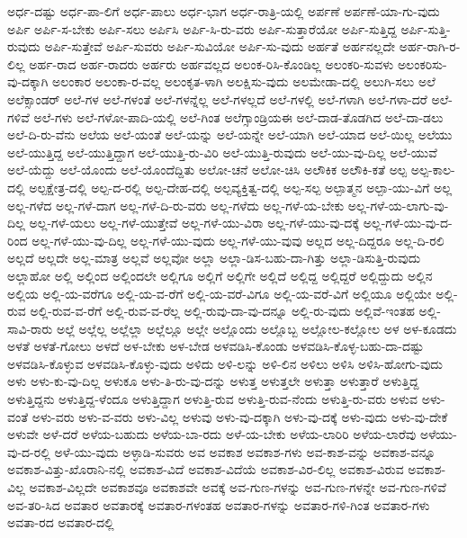 {ಅರ್ಧ-ದಷ್ಟು
ಅರ್ಧ-ಪಾ-ಲಿಗೆ
ಅರ್ಧ-ಪಾಲು
ಅರ್ಧ-ಭಾಗ
ಅರ್ಧ-ರಾತ್ರಿ-ಯಲ್ಲಿ
ಅರ್ಪಣೆ
ಅರ್ಪಣೆ-ಯಾ-ಗು-ವುದು
ಅರ್ಪಿ
ಅರ್ಪಿ-ಸ-ಬೇಕು
ಅರ್ಪಿ-ಸಲು
ಅರ್ಪಿಸಿ
ಅರ್ಪಿ-ಸಿ-ರು-ವರು
ಅರ್ಪಿ-ಸುತ್ತಾರೆಯೋ
ಅರ್ಪಿ-ಸುತ್ತಿದ್ದ
ಅರ್ಪಿ-ಸುತ್ತಿ-ರುವುದು
ಅರ್ಪಿ-ಸುತ್ತೇವೆ
ಅರ್ಪಿ-ಸುವರು
ಅರ್ಪಿ-ಸುವಿಯೋ
ಅರ್ಪಿ-ಸು-ವುದು
ಅರ್ಹತೆ
ಅರ್ಹನಲ್ಲದೇ
ಅರ್ಹ-ರಾಗಿ-ರ-ಲಿಲ್ಲ
ಅರ್ಹ-ರಾದ
ಅರ್ಹ-ರಾದರು
ಅರ್ಹರು
ಅರ್ಹವಲ್ಲದ
ಅಲಂಕ-ರಿಸಿ-ಕೊಂಡಿಲ್ಲ
ಅಲಂಕರಿ-ಸುವಳು
ಅಲಂಕರಿಸು-ವು-ದಕ್ಕಾಗಿ
ಅಲಂಕಾರ
ಅಲಂಕಾ-ರ-ವಲ್ಲ
ಅಲಂಕೃತ-ಳಾಗಿ
ಅಲಕ್ಷಿಸು-ವುದು
ಅಲಮೇಡಾ-ದಲ್ಲಿ
ಅಲುಗಿ-ಸಲು
ಅಲೆ
ಅಲೆಕ್ಸಾಂಡರ್
ಅಲೆ-ಗಳ
ಅಲೆ-ಗಳಂತೆ
ಅಲೆ-ಗಳನ್ನೆಲ್ಲ
ಅಲೆ-ಗಳಲ್ಲದೆ
ಅಲೆ-ಗಳಲ್ಲಿ
ಅಲೆ-ಗಳಾಗಿ
ಅಲೆ-ಗಳಾ-ದರೆ
ಅಲೆ-ಗಳಿವೆ
ಅಲೆ-ಗಳು
ಅಲೆ-ಗಳೋ-ಪಾದಿ-ಯಲ್ಲಿ
ಅಲೆ-ಗಿಂತ
ಅಲೆಗ್ಸಾಂಡ್ರಿಯಈ
ಅಲೆ-ದಾಡ-ತೊಡಗಿದ
ಅಲೆ-ದಾ-ಡಲು
ಅಲೆ-ದಿ-ರು-ವೆನು
ಅಲೆಯ
ಅಲೆ-ಯಂತೆ
ಅಲೆ-ಯನ್ನು
ಅಲೆ-ಯನ್ನೇ
ಅಲೆ-ಯಾಗಿ
ಅಲೆ-ಯಾದ
ಅಲೆ-ಯಿಲ್ಲ
ಅಲೆಯು
ಅಲೆ-ಯುತ್ತಿದ್ದ
ಅಲೆ-ಯುತ್ತಿದ್ದಾಗ
ಅಲೆ-ಯುತ್ತಿ-ರು-ವಿರಿ
ಅಲೆ-ಯುತ್ತಿ-ರುವುದು
ಅಲೆ-ಯು-ವು-ದಿಲ್ಲ
ಅಲೆ-ಯುವೆ
ಅಲೆ-ಯೆದ್ದು
ಅಲೆ-ಯೊಂದು
ಅಲೆ-ಯೊಂದೆದ್ದಿತು
ಅಲೋ-ಚನೆ
ಅಲೋ-ಚಿಸಿ
ಅಲೌಕಿಕ
ಅಲೌಕಿ-ಕತೆ
ಅಲ್ಪ
ಅಲ್ಪ-ಕಾಲ-ದಲ್ಲಿ
ಅಲ್ಪಕ್ಷೇತ್ರ-ದಲ್ಲಿ
ಅಲ್ಪ-ದ-ರಲ್ಲಿ
ಅಲ್ಪ-ದೇಹ-ದಲ್ಲಿ
ಅಲ್ಪವ್ಯಕ್ತಿತ್ವ-ದಲ್ಲಿ
ಅಲ್ಪ-ಸಲ್ಪ
ಅಲ್ಪಾತ್ಮನ
ಅಲ್ಪಾ-ಯು-ವಿಗೆ
ಅಲ್ಲ
ಅಲ್ಲ-ಗಳೆದ
ಅಲ್ಲ-ಗಳೆ-ದಾಗ
ಅಲ್ಲ-ಗಳೆ-ದಿ-ರು-ವರು
ಅಲ್ಲ-ಗಳೆದು
ಅಲ್ಲ-ಗಳೆ-ಯ-ಬೇಕು
ಅಲ್ಲ-ಗಳೆ-ಯ-ಲಾಗು-ವು-ದಿಲ್ಲ
ಅಲ್ಲ-ಗಳೆ-ಯಲು
ಅಲ್ಲ-ಗಳೆ-ಯುತ್ತೇವೆ
ಅಲ್ಲ-ಗಳೆ-ಯು-ವಿರಾ
ಅಲ್ಲ-ಗಳೆ-ಯು-ವು-ದಕ್ಕೆ
ಅಲ್ಲ-ಗಳೆ-ಯು-ವು-ದ-ರಿಂದ
ಅಲ್ಲ-ಗಳೆ-ಯು-ವು-ದಿಲ್ಲ
ಅಲ್ಲ-ಗಳೆ-ಯು-ವುದು
ಅಲ್ಲ-ಗಳೆ-ಯು-ವುವು
ಅಲ್ಲದ
ಅಲ್ಲ-ದಿದ್ದರೂ
ಅಲ್ಲ-ದಿ-ರಲಿ
ಅಲ್ಲದೆ
ಅಲ್ಲದೇ
ಅಲ್ಲ-ಮಾತ್ರ
ಅಲ್ಲವೆ
ಅಲ್ಲವೋ
ಅಲ್ಲಾ
ಅಲ್ಲಾ-ಡಿಸ-ಬಹು-ದಾ-ಗಿತ್ತು
ಅಲ್ಲಾ-ಡಿಸುತ್ತಿ-ರುವುದು
ಅಲ್ಲಾಹೋ
ಅಲ್ಲಿ
ಅಲ್ಲಿಂದ
ಅಲ್ಲಿಂದಲೇ
ಅಲ್ಲಿಗೂ
ಅಲ್ಲಿಗೆ
ಅಲ್ಲಿಗೇ
ಅಲ್ಲಿದೆ
ಅಲ್ಲಿದ್ದ
ಅಲ್ಲಿದ್ದರೆ
ಅಲ್ಲಿದ್ದುದು
ಅಲ್ಲಿನ
ಅಲ್ಲಿಯ
ಅಲ್ಲಿ-ಯ-ವರೆಗೂ
ಅಲ್ಲಿ-ಯ-ವ-ರೆಗೆ
ಅಲ್ಲಿ-ಯ-ವರೆ-ವಿಗೂ
ಅಲ್ಲಿ-ಯ-ವರೆ-ವಿಗೆ
ಅಲ್ಲಿಯೂ
ಅಲ್ಲಿಯೇ
ಅಲ್ಲಿ-ರುವ
ಅಲ್ಲಿ-ರುವ-ವ-ರೆಗೆ
ಅಲ್ಲಿ-ರುವ-ವ-ರೆಲ್ಲ
ಅಲ್ಲಿ-ರುವು-ದಾ-ವು-ದನ್ನೂ
ಅಲ್ಲಿ-ರು-ವುದು
ಅಲ್ಲಿವೆ-ಇಂತಹ
ಅಲ್ಲಿ-ಸಾವಿ-ರಾರು
ಅಲ್ಲೆ
ಅಲ್ಲೆಲ್ಲ
ಅಲ್ಲೆಲ್ಲಾ
ಅಲ್ಲೆಲ್ಲೂ
ಅಲ್ಲೇ
ಅಲ್ಲೊಂದು
ಅಲ್ಲೊಬ್ಬ
ಅಲ್ಲೋಲ-ಕಲ್ಲೋಲ
ಅಳ
ಅಳ-ಕೂಡದು
ಅಳತೆ
ಅಳತೆ-ಗೋಲು
ಅಳದೆ
ಅಳ-ಬೇಕು
ಅಳ-ಬೇಡ
ಅಳವಡಿಸಿ-ಕೊಂಡು
ಅಳವಡಿಸಿ-ಕೊಳ್ಳ-ಬಹು-ದಾ-ದಷ್ಟು
ಅಳವಡಿಸಿ-ಕೊಳ್ಳುವ
ಅಳವಡಿಸಿ-ಕೊಳ್ಳು-ವುದು
ಅಳಿದು
ಅಳಿ-ಲನ್ನು
ಅಳಿ-ಲಿನ
ಅಳಿಲು
ಅಳಿಸಿ
ಅಳಿಸಿ-ಹೋಗು-ವುದು
ಅಳು
ಅಳು-ಕು-ವು-ದಿಲ್ಲ
ಅಳುಕೂ
ಅಳು-ತಿ-ರು-ವು-ದನ್ನು
ಅಳುತ್ತ
ಅಳುತ್ತಲೇ
ಅಳುತ್ತಾ
ಅಳುತ್ತಾರೆ
ಅಳುತ್ತಿದ್ದ
ಅಳುತ್ತಿದ್ದನು
ಅಳುತ್ತಿದ್ದ-ಳೆಂದೂ
ಅಳುತ್ತಿದ್ದಾಗ
ಅಳುತ್ತಿ-ರುವ
ಅಳುತ್ತಿ-ರುವ-ನೆಂದು
ಅಳುತ್ತಿ-ರು-ವರು
ಅಳುವ
ಅಳು-ವಂತೆ
ಅಳು-ವರು
ಅಳು-ವ-ವರು
ಅಳು-ವಿಲ್ಲ
ಅಳುವು
ಅಳು-ವು-ದಕ್ಕಾಗಿ
ಅಳು-ವು-ದಕ್ಕೆ
ಅಳು-ವುದು
ಅಳು-ವು-ದೇಕೆ
ಅಳುವೇ
ಅಳೆ-ದರೆ
ಅಳೆಯ-ಬಹುದು
ಅಳೆಯ-ಬಾ-ರದು
ಅಳೆ-ಯ-ಬೇಕು
ಅಳೆಯ-ಲಾರಿರಿ
ಅಳೆಯ-ಲಾರೆವು
ಅಳೆಯು-ವು-ದ-ರಲ್ಲಿ
ಅಳೆ-ಯು-ವುದು
ಅಳ್ಳಾಡಿ-ಸುವರು
ಅವ
ಅವಕಾಶ
ಅವಕಾಶ-ಗಳು
ಅವ-ಕಾಶ-ವನ್ನು
ಅವಕಾಶ-ವನ್ನೂ
ಅವಕಾಶ-ವಿತ್ತು-ಖೊರಾನಿ-ನಲ್ಲಿ
ಅವಕಾಶ-ವಿದೆ
ಅವಕಾಶ-ವಿದೆಯೆ
ಅವಕಾಶ-ವಿರ-ಲಿಲ್ಲ
ಅವಕಾಶ-ವಿರುವ
ಅವಕಾಶ-ವಿಲ್ಲ
ಅವಕಾಶ-ವಿಲ್ಲದೇ
ಅವಕಾಶವೂ
ಅವಕಾಶವೇ
ಅವಕ್ಕೆ
ಅವ-ಗುಣ-ಗಳನ್ನು
ಅವ-ಗುಣ-ಗಳನ್ನೇ
ಅವ-ಗುಣ-ಗಳಿವೆ
ಅವ-ತರಿ-ಸಿದ
ಅವತಾರ
ಅವತಾರಕ್ಕೆ
ಅವತಾರ-ಗಳಂತಹ
ಅವತಾರ-ಗಳನ್ನು
ಅವತಾರ-ಗಳಿ-ಗಿಂತ
ಅವತಾರ-ಗಳು
ಅವತಾ-ರದ
ಅವತಾರ-ದಲ್ಲಿ
}
